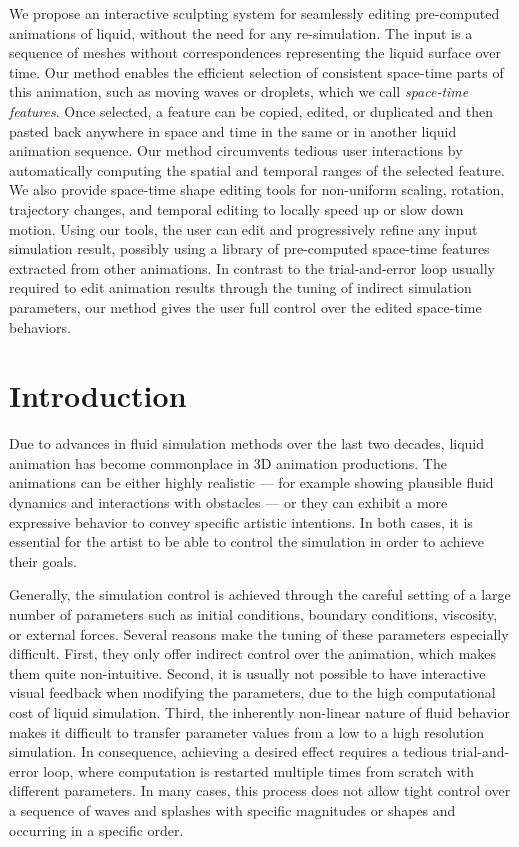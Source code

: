 We propose an interactive sculpting system for seamlessly editing pre-computed animations of liquid, without the need for any re-simulation. 
The input is a sequence of meshes without correspondences representing the liquid surface over time. 
Our method enables the efficient selection of consistent space-time parts of this animation, such as moving waves or droplets, which we call {\em space-time features}. 
Once selected, a feature can be copied, edited, or duplicated and then pasted back anywhere in space and time in the same or in another liquid animation sequence. 
Our method circumvents tedious user interactions by automatically computing the spatial and temporal ranges of the selected feature. 
We also provide space-time shape editing tools for non-uniform scaling, rotation, trajectory changes, and temporal editing to locally speed up or slow down motion.
Using our tools, the user can edit and progressively refine any input simulation result, possibly using a library of pre-computed space-time features extracted from other animations. 
In contrast to the trial-and-error loop usually required to edit animation results through the tuning of indirect simulation parameters, our method gives the user full control over the edited space-time behaviors. 

\section{Introduction} \label{sec:introduction}

Due to advances in fluid simulation methods over the last two decades, liquid animation has become commonplace in 3D animation productions. 
The animations can be either highly realistic --- for example showing plausible fluid dynamics and interactions with obstacles --- or they can exhibit a more expressive behavior to convey specific artistic intentions. In both cases, it is essential for the artist to be able to control the simulation in order to achieve their goals.

Generally, the simulation control is achieved through the careful setting of a large number of parameters such as initial conditions, boundary conditions, viscosity, or external forces. 
Several reasons make the tuning of these parameters especially difficult. 
First, they only offer indirect control over the animation, which makes them quite non-intuitive. 
Second, it is usually not possible to have interactive visual feedback when modifying the parameters, due to the high computational cost of 
liquid simulation.
Third, the inherently non-linear nature of fluid behavior makes it difficult to transfer parameter values from a low to a high resolution simulation. 
In consequence, achieving a desired effect requires a tedious trial-and-error loop, where computation is restarted multiple times from scratch with different parameters. 
In many cases, this process does not allow tight control over a sequence of waves and splashes with specific magnitudes or shapes and occurring in a specific order. 

